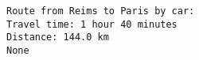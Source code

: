\protect{}\label{69900ff1}
\begin{Shaded}
\begin{Highlighting}[]
\NormalTok{, }\NormalTok{, }\NormalTok{))}
\end{Highlighting}
\end{Shaded}

\begin{verbatim}
Route from Reims to Paris by car:
Travel time: 1 hour 40 minutes
Distance: 144.0 km
None
\end{verbatim}

\protect{}\label{2e4ae18a}
\begin{Shaded}
\begin{Highlighting}[]

\end{Highlighting}
\end{Shaded}
